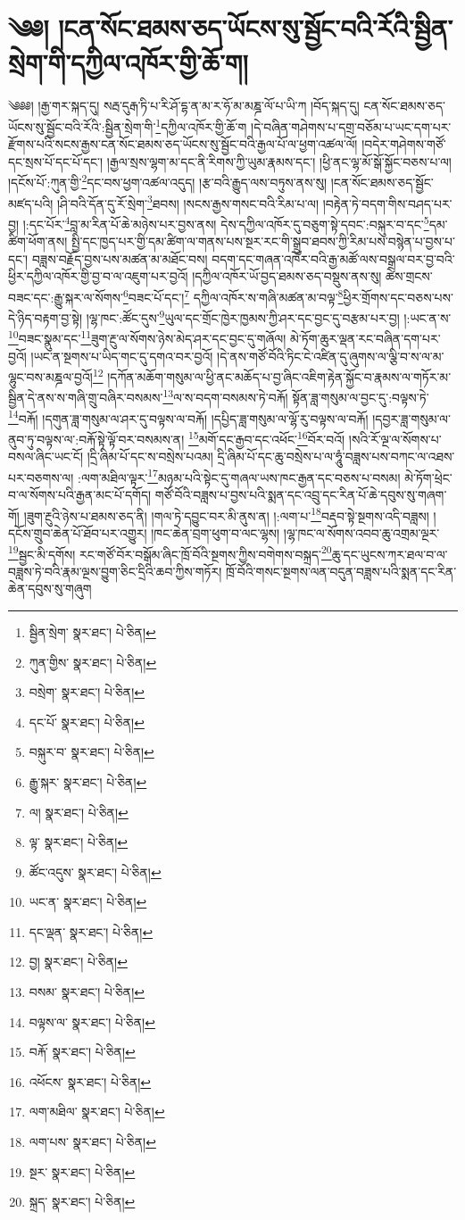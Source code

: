 \setcounter{footnote}{0} 
\chapter{༄༅། །ངན་སོང་ཐམས་ཅད་ཡོངས་སུ་སྦྱོང་བའི་རོའི་སྦྱིན་སྲེག་གི་དཀྱིལ་འཁོར་གྱི་ཆོ་ག།}༄༅༅། །རྒྱ་གར་སྐད་དུ། སརྦ་དུརྒ་ཏི་པ་རི་ཤོ་དྷ་ན་མ་ར་ཧོ་མ་མཎྜ་ལོ་པ་ཡི་ཀ །བོད་སྐད་དུ། ངན་སོང་ཐམས་ཅད་ཡོངས་སུ་སྦྱོང་བའི་རོའི་:སྦྱིན་སྲེག་གི་\footnote{སྦྱིན་སྲེག་  སྣར་ཐང་།  པེ་ཅིན། }དཀྱིལ་འཁོར་གྱི་ཆོ་ག །དེ་བཞིན་གཤེགས་པ་དགྲ་བཅོམ་པ་ཡང་དག་པར་རྫོགས་པའི་སངས་རྒྱས་ངན་སོང་ཐམས་ཅད་ཡོངས་སུ་སྦྱོང་བའི་རྒྱལ་པོ་ལ་ཕྱག་འཚལ་ལོ། །བདེར་གཤེགས་གཙོ་དང་སྲས་པོ་དང་པོ་དང་། །རྒྱལ་སྲས་ལྷག་མ་དང་ནི་རིགས་ཀྱི་ཡུམ་རྣམས་དང་། །ཕྱི་ནང་ལྷ་མོ་སྒོ་སྐྱོང་བཅས་པ་ལ། །དངོས་པོ་:ཀུན་གྱི་\footnote{ཀུན་གྱིས་  སྣར་ཐང་།  པེ་ཅིན། }དང་བས་ཕྱག་འཚལ་འདུད། །རྩ་བའི་རྒྱུད་ལས་བཏུས་ནས་སུ། །ངན་སོང་ཐམས་ཅད་སྦྱོང་མཛད་པའི། །ཤི་བའི་དོན་དུ་རོ་སྲེག་\footnote{བསྲེག་  སྣར་ཐང་།  པེ་ཅིན། }ཐབས། །སངས་རྒྱས་གསང་བའི་རིམ་པ་ལ། །བརྟེན་ཏེ་བདག་གིས་བཤད་པར་བྱ། །:དང་པོར་\footnote{དང་པོ་  སྣར་ཐང་།  པེ་ཅིན། }བླ་མ་རིན་པོ་ཆེ་མཉེས་པར་བྱས་ནས། དེས་དཀྱིལ་འཁོར་དུ་བཅུག་སྟེ་དབང་:བསྐུར་བ་དང་\footnote{བསྐུར་བ་  སྣར་ཐང་།  པེ་ཅིན། }དམ་ཚིག་ཕོག་ནས། སྤྱི་དང་ཁྱད་པར་གྱི་དམ་ཚིག་ལ་གནས་པས་སྔར་རང་གི་སྒྲུབ་ཐབས་ཀྱི་རིམ་པས་བསྙེན་པ་བྱས་པ་དང་། བཟླས་བརྗོད་བྱས་པས་མཚན་མ་མཐོང་བས། བདག་དང་གཞན་འཁོར་བའི་རྒྱ་མཚོ་ལས་བསྒྲལ་བར་བྱ་བའི་ཕྱིར་དཀྱིལ་འཁོར་གྱི་བྱ་བ་ལ་འཇུག་པར་བྱའོ། །དཀྱིལ་འཁོར་ཡོ་བྱད་ཐམས་ཅད་བསྡུས་ནས་སུ། ཚེས་གྲངས་བཟང་དང་:རྒྱུ་སྐར་ལ་སོགས་\footnote{རྒྱུ་སྐར་  སྣར་ཐང་།  པེ་ཅིན། }བཟང་པོ་དང་།\footnote{ལ།  སྣར་ཐང་།  པེ་ཅིན། } དཀྱིལ་འཁོར་ས་གཞི་མཚན་མ་བལྟ་\footnote{ལྟ་  སྣར་ཐང་།  པེ་ཅིན། }ཕྱིར་གྲོགས་དང་བཅས་པས་དེ་ཉིད་བརྟག་བྱ་སྟེ། །ལྷ་ཁང་:ཚོང་དུས་\footnote{ཚོང་འདུས་  སྣར་ཐང་།  པེ་ཅིན། }ཡུལ་དང་གྲོང་ཁྱེར་ཁྱམས་ཀྱི་ཤར་དང་བྱང་དུ་བརྩམ་པར་བྱ། །:ཡང་ན་ས་\footnote{ཡང་ན་  སྣར་ཐང་།  པེ་ཅིན། }བཟང་སྣུམ་དང་\footnote{དང་ལྡན་  སྣར་ཐང་།  པེ་ཅིན། }ཟུག་རྔུ་ལ་སོགས་ཉེས་མེད་ཤར་དང་བྱང་དུ་གཞོལ། མེ་ཏོག་ཆུར་ལྡན་རང་བཞིན་དག་པར་བྱའོ། །ཡང་ན་སྔགས་པ་ཡིད་གང་དུ་དགའ་བར་བྱའོ། །དེ་ནས་གཙོ་བོའི་ཏིང་ངེ་འཛིན་དུ་ཞུགས་ལ་ལྕི་བ་ས་ལ་མ་ལྷུང་བས་མཎྜལ་བྱའོ།\footnote{བྱ།  སྣར་ཐང་།  པེ་ཅིན། } །དཀོན་མཆོག་གསུམ་ལ་ཕྱི་ནང་མཆོད་པ་བྱ་ཞིང་འཇིག་རྟེན་སྐྱོང་བ་རྣམས་ལ་གཏོར་མ་སྦྱིན་དེ་ནས་ས་གཞི་གྲུ་བཞིར་བསམས་\footnote{བསམ་  སྣར་ཐང་།  པེ་ཅིན། }ལ་ས་བདག་བསམས་ཏེ་བརྐོ། སྟོན་ཟླ་གསུམ་ལ་བྱང་དུ་:བལྟས་ཏེ་\footnote{བལྟས་ལ་  སྣར་ཐང་།  པེ་ཅིན། }བརྐོ། །དགུན་ཟླ་གསུམ་ལ་ཤར་དུ་བལྟས་ལ་བརྐོ། །དཔྱིད་ཟླ་གསུམ་ལ་ལྷོ་རུ་བལྟས་ལ་བརྐོ། །དབྱར་ཟླ་གསུམ་ལ་ནུབ་ཏུ་བལྟས་ལ་:བརྐོ་སྟེ་ལྟོ་བར་བསམས་ན། \footnote{བརྐོ་  སྣར་ཐང་།  པེ་ཅིན། }མགོ་དང་རྒྱབ་དང་འཕོང་\footnote{འཕོངས་  སྣར་ཐང་།  པེ་ཅིན། }བོར་བའོ། །སའི་རོ་ལྔ་ལ་སོགས་པ་བསལ་ཞིང་ཡང་ངོ། །དྲི་ཞིམ་པོ་དང་ས་བསྲེས་པའམ། དྲི་ཞིམ་པོ་དང་ཆུ་བསྲེས་པ་ལ་ཧཱུཾ་བཟླས་པས་བཀང་ལ་འཐས་པར་བཅགས་ལ། :ལག་མཐིལ་ལྟར་\footnote{ལག་མཐིལ་  སྣར་ཐང་།  པེ་ཅིན། }མཉམ་པའི་སྟེང་དུ་གཞལ་ཡས་ཁང་རྒྱན་དང་བཅས་པ་བསམ། མེ་ཏོག་ཕྲེང་བ་ལ་སོགས་པའི་རྒྱན་མང་པོ་དགོད། གཙོ་བོའི་བཟླས་པ་བྱས་པའི་སྨན་དང་འབྲུ་དང་རིན་པོ་ཆེ་དབུས་སུ་གཞག་གོ། །ཟུག་རྔུའི་ཉེས་པ་ཐམས་ཅད་ནི། །གལ་ཏེ་དབྱུང་བར་མི་ནུས་ན། །:ལག་པ་\footnote{ལག་པས་  སྣར་ཐང་།  པེ་ཅིན། }བརྡབ་སྟེ་སྔགས་འདི་བཟླས། །དངོས་གྲུབ་ཆེན་པོ་ཐོབ་པར་འགྱུར། །ཁང་ཆེན་བྲག་ཕུག་བ་ལང་ལྷས། །ལྷ་ཁང་ལ་སོགས་འབབ་ཆུ་འགྲམ་ལྔར་\footnote{སྔར་  སྣར་ཐང་།  པེ་ཅིན། }སྦྱང་མི་དགོས། རང་གཙོ་བོར་བསྒོམ་ཞིང་ཁྲོ་བོའི་སྔགས་ཀྱིས་བགེགས་བསྐྲད་\footnote{སྐྲད་  སྣར་ཐང་།  པེ་ཅིན། }ཆུ་དང་ཡུངས་ཀར་ཐལ་བ་ལ་བཟླས་ཏེ་བའི་རྣམ་ལྔས་བྱུག་ཅིང་དྲིའི་ཆབ་ཀྱིས་གཏོར། ཁྲོ་བོའི་གསང་སྔགས་ལན་བདུན་བཟླས་པའི་སྨན་དང་རིན་ཆེན་དབུས་སུ་གཞུག 